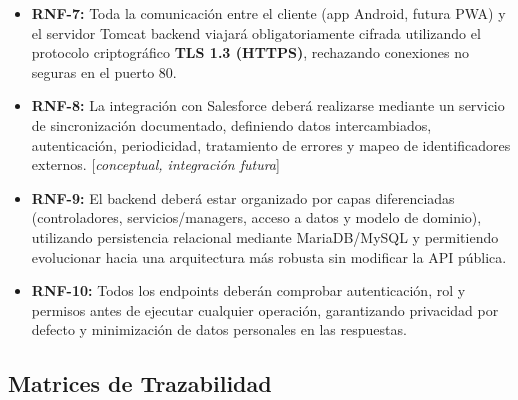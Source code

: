 \documentclass{report}
\begin{document}
\begin{itemize}
    \item \textbf{RNF-7:} Toda la comunicación entre el cliente (app Android, futura PWA) y el servidor Tomcat backend viajará obligatoriamente cifrada utilizando el protocolo criptográfico \textbf{TLS 1.3 (HTTPS)}, rechazando conexiones no seguras en el puerto 80.
    \item \textbf{RNF-8:} La integración con Salesforce deberá realizarse mediante un servicio de sincronización documentado, definiendo datos intercambiados, autenticación, periodicidad, tratamiento de errores y mapeo de identificadores externos. [\textit{conceptual, integración futura}]
    \item \textbf{RNF-9:} El backend deberá estar organizado por capas diferenciadas (controladores, servicios/managers, acceso a datos y modelo de dominio), utilizando persistencia relacional mediante MariaDB/MySQL y permitiendo evolucionar hacia una arquitectura más robusta sin modificar la API pública.
    \item \textbf{RNF-10:} Todos los endpoints deberán comprobar autenticación, rol y permisos antes de ejecutar cualquier operación, garantizando privacidad por defecto y minimización de datos personales en las respuestas.
\end{itemize}

\subsection{Matrices de Trazabilidad}
\end{document}

